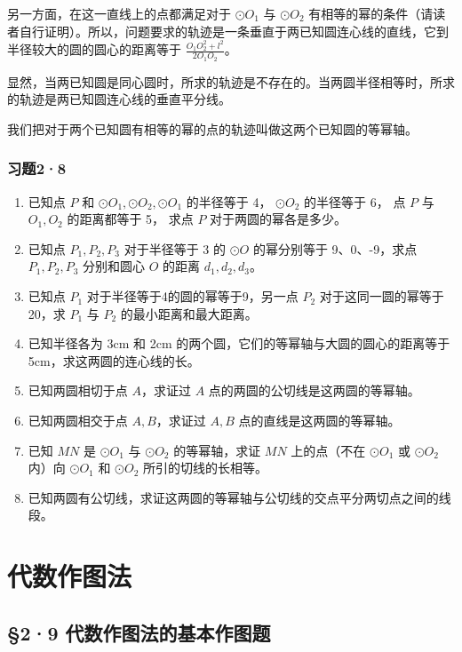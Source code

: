 另一方面，在这一直线上的点都满足对于 \(\odot O_{1}\) 与 \(\odot O_{2}\)
有相等的幂的条件（请读者自行证明）。所以，问题要求的轨迹是一条垂直于两已知圆连心线的直线，它到半径较大的圆的圆心的距离等于
\(\frac{O_1O_2^2 + l^2}{2O_1O_2}\)。

显然，当两已知圆是同心圆时，所求的轨迹是不存在的。当两圆半径相等时，所求的轨迹是两已知圆连心线的垂直平分线。

我们把对于两个已知圆有相等的幂的点的轨迹叫做这两个已知圆的等幂轴。

\subsubsection{习题2·8}

\begin{enumerate}
\item
  已知点 \(P\) 和 \(\odot O_1, \odot O_2, \odot O_1\) 的半径等于 4，
  \(\odot O_2\) 的半径等于 6， 点 \(P\) 与 \(O_1, O_2\) 的距离都等于 5，
  求点 \(P\) 对于两圆的幂各是多少。
\item
  已知点 \(P_{1}, P_{2}, P_{3}\) 对于半径等于 3 的 \(\odot O\)
  的幂分别等于 9、0、-9，求点 \(P_{1}, P_{2}, P_{3}\) 分别和圆心 \(O\)
  的距离 \(d_{1}, d_{2}, d_{3}\)。
\item
  已知点 \(P_{1}\) 对于半径等于4的圆的幂等于9，另一点 \(P_{2}\)
  对于这同一圆的幂等于20，求 \(P_{1}\) 与 \(P_{2}\)
  的最小距离和最大距离。
\item
  已知半径各为 3cm 和 2cm 的两个圆，它们的等幂轴与大圆的圆心的距离等于
  5cm，求这两圆的连心线的长。
\item
  已知两圆相切于点 \(A\)，求证过 \(A\)
  点的两圆的公切线是这两圆的等幂轴。
\item
  已知两圆相交于点 \(A, B\)，求证过 \(A, B\) 点的直线是这两圆的等幂轴。
\item
  已知 \(MN\) 是 \(\odot O_{1}\) 与 \(\odot O_{2}\) 的等幂轴，求证
  \(MN\) 上的点（不在 \(\odot O_{1}\) 或 \(\odot O_{2}\) 内）向
  \(\odot O_{1}\) 和 \(\odot O_{2}\) 所引的切线的长相等。
\item
  已知两圆有公切线，求证这两圆的等幂轴与公切线的交点平分两切点之间的线段。
\end{enumerate}

\section{代数作图法}

\subsection{§2·9
代数作图法的基本作图题}

